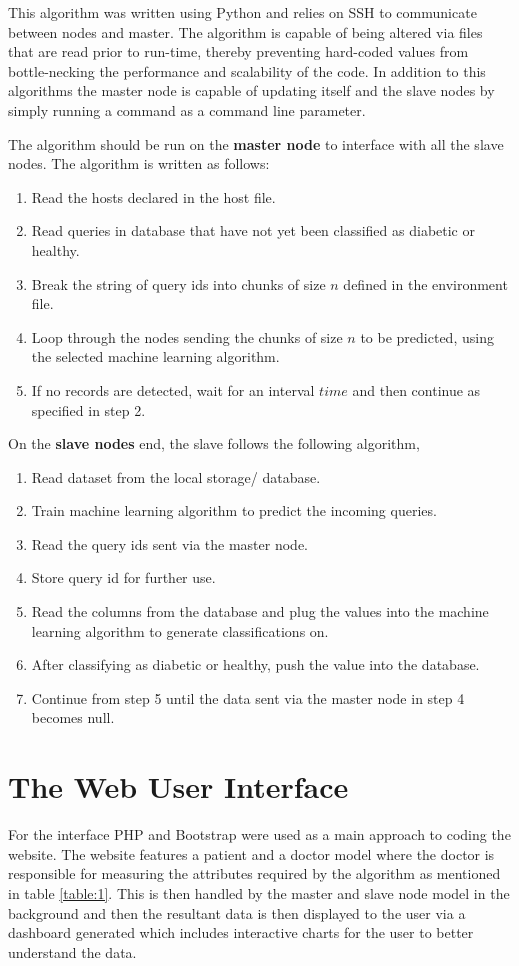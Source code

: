 \documentclass[12pt]{article}
\begin{document}
This algorithm was written using Python and relies on SSH to communicate between nodes and master. The algorithm is capable of being altered via files that are read prior to run-time, thereby preventing hard-coded values from bottle-necking the performance and scalability of the code. In addition to this algorithms the master node is capable of updating itself and the slave nodes by simply running a command as a command line parameter.

The algorithm should be run on the \textbf{master node} to interface with all the slave nodes. The algorithm is written as follows:
\begin{enumerate}
\item Read the hosts declared in the host file.
\item Read queries in database that have not yet been classified as diabetic or healthy.
\item Break the string of query ids into chunks of size $n$ defined in the environment file.
\item Loop through the nodes sending the chunks of size $n$ to be predicted, using the selected machine learning algorithm.
\item If no records are detected, wait for an interval $time$ and then continue as specified in step 2.
\end{enumerate}

On the \textbf{slave nodes} end, the slave follows the following algorithm, 
\begin{enumerate}
\item Read dataset from the local storage/ database.
\item Train machine learning algorithm to predict the incoming queries.
\item Read the query ids sent via the master node.
\item Store query id for further use.
\item Read the columns from the database and plug the values into the machine learning algorithm to generate  classifications on.
\item After classifying as diabetic or healthy, push the value into the database.
\item Continue from step 5 until the data sent via the master node in step 4 becomes null.
\end{enumerate}

\newpage
\section{The Web User Interface}
For the interface PHP and Bootstrap were used as a main approach to coding the website. The website features a patient and a doctor model where the doctor is responsible for measuring the attributes required by the algorithm as mentioned in table \ref{table:1}. This is then handled by the master and slave node model in the background and then the resultant data is then displayed to the user via a dashboard generated which includes interactive charts for the user to better understand the data.
\end{document}

